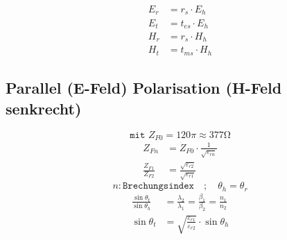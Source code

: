 \begin{align*}
    E_{r} & = r_{s} \cdot E_{h}   \\
    E_{t} & = t_{e s} \cdot E_{h} \\
    H_{r} & = r_{s} \cdot H_{h}   \\
    H_{t} & = t_{m s} \cdot H_{h}
\end{align*}

\subsection{Parallel (E-Feld) Polarisation (H-Feld senkrecht)}


\[ \boxed{\texttt{mit } Z_{F0} = 120\pi \approx 377\si{\ohm}} \]
\begin{align*}
    Z_{Fn}                & = Z_{F0}\cdot\frac{1}{\sqrt{\varepsilon_{rn}}}            \\
    \frac{Z_{F1}}{Z_{F2}} & = \frac{\sqrt{\varepsilon_{r2}}}{\sqrt{\varepsilon_{r1}}}
\end{align*}
\[ n: \texttt{Brechungsindex} \quad ; \quad \theta_h = \theta_r\]
\begin{align*}
    \frac{\sin\theta_t}{\sin\theta_h} & = \frac{\lambda_2}{\lambda_1}= \frac{\beta_1}{\beta_2}= \frac{n_1}{n_2} \\
    \sin\theta_t                      & = \sqrt{\frac{\varepsilon_{r1}}{\varepsilon_{r2}}}\cdot\sin\theta_h
\end{align*}

